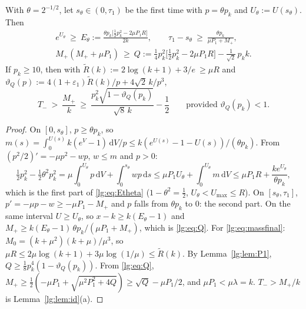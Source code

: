 \begin{lemma}\label{lg:lem:mass}
With $\theta=2^{-1/2}$, let $s_\theta\in(0,\tau_1)$ be the first time with $p=\theta p_k$ and
$U_\theta:=U(s_\theta)$. Then
\begin{gather}
e^{U_\theta}\ \ge\ E_\theta:=\frac{\theta p_k\bigl[\tfrac12p_k^2-2\mu P_1R\bigr]}{2k},\qquad
\tau_1-s_\theta\ \ge\ \frac{\theta p_k}{\mu P_1+M_+},\label{lg:eq:Etheta}\\
M_+(M_++\mu P_1)\ \ge\ Q:=\tfrac14p_k^2\bigl[\tfrac12p_k^2-2\mu P_1R\bigr]-\tfrac{1}{\sqrt2}\,p_kk .\label{lg:eq:Q}
\end{gather}
If $p_k\ge10$, then with $\tilde R(k):=2\log(k+1)+3/e\ \ge\mu R$ and
$\vartheta_Q(p):=4(1+\varepsilon_1)\tilde R(k)/p+4\sqrt2\,k/p^3$,
\begin{equation}\label{lg:eq:massfinal}
T_-\ >\ \frac{M_+}{k}\ \ge\ \frac{p_k^2\sqrt{1-\vartheta_Q(p_k)}}{\sqrt8\,k}-\frac12
\qquad\text{provided }\vartheta_Q(p_k)<1 .
\end{equation}
\end{lemma}
\begin{proof}
On $[0,s_\theta]$, $p\ge\theta p_k$, so $m(s)=\int_0^{U(s)}k(e^V-1)\,\mathrm dV/p\le k(e^{U(s)}-1-U(s))/(\theta p_k)$.
From $(p^2/2)'=-\mu p^2-wp$, $w\le m$ and $p>0$:
\[
\tfrac12p_k^2-\tfrac12\theta^2p_k^2=\mu\!\int_0^{U_\theta}\!p\,\mathrm dV+\!\int_0^{s_\theta}\!wp\,\mathrm ds
\le\mu P_1U_\theta+\!\int_0^{U_\theta}\!m\,\mathrm dV\le\mu P_1R+\frac{ke^{U_\theta}}{\theta p_k},
\]
which is the first part of \eqref{lg:eq:Etheta} ($1-\theta^2=\tfrac12$, $U_\theta<U_{\max}\le R$). On $[s_\theta,\tau_1]$,
$p'=-\mu p-w\ge-\mu P_1-M_+$ and $p$ falls from $\theta p_k$ to $0$: the second part. On the same
interval $U\ge U_\theta$, so $x-k\ge k(E_\theta-1)$ and
$M_+\ge k(E_\theta-1)\,\theta p_k/(\mu P_1+M_+)$, which is \eqref{lg:eq:Q}.
For \eqref{lg:eq:massfinal}: $M_0=(k+\mu^2)(k+\mu)/\mu^3$, so
$\mu R\le2\mu\log(k+1)+3\mu\log(1/\mu)\le\tilde R(k)$. By Lemma~\ref{lg:lem:P1},
$Q\ge\tfrac18p_k^4(1-\vartheta_Q(p_k))$. From \eqref{lg:eq:Q},
$M_+\ge\tfrac12(-\mu P_1+\sqrt{\mu^2P_1^2+4Q})\ge\sqrt Q-\mu P_1/2$, and $\mu P_1<\mu\lambda=k$.
$T_->M_+/k$ is Lemma~\ref{lg:lem:id}(a).
\end{proof}

